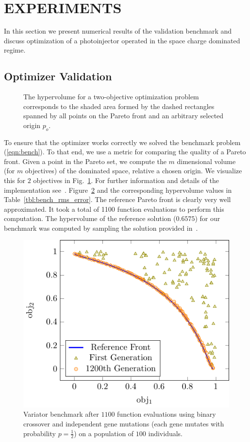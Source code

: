 \section{EXPERIMENTS} \label{sec:experiments}

In this section we present numerical results of the validation benchmark and
  discuss optimization of a photoinjector operated in the space charge dominated regime.

\subsection{Optimizer Validation}

\begin{figure}
    \centering
    \begin{tikzpicture}[text=black]
      
    \end{tikzpicture}
  \caption{The hypervolume for a two-objective optimization problem
  corresponds to the shaded area formed by the dashed rectangles spanned by
  all points on the Pareto front and an arbitrary selected origin $p_o$.}
  \label{fig:hypervolume}
\end{figure}

To ensure that the optimizer works correctly we solved the benchmark
  problem (\ref{eqn:bench}).
To that end, we use a metric for comparing the quality of a Pareto
  front.
Given a point in the Pareto set, we compute the $m$ dimensional volume (for
  $m$ objectives) of the dominated space, relative a chosen origin.
We visualize this for $2$ objectives in Fig.~\ref{fig:hypervolume}.
For further information and details of the implementation see~\cite{whbb:12}.
Figure~\ref{fig:pisa_bench} and the corresponding hypervolume values in
  Table~\ref{tbl:bench_rms_error}.
The reference Pareto front is clearly very well approximated.
It took a total of 1100 function evaluations to perform this computation.
The hypervolume of the reference solution ($0.6575$) for our benchmark was
  computed by sampling the solution provided in~\cite{hbwh:05}.

\begin{figure}
  \centering
    \includegraphics[width=0.7\linewidth]{figures/valid_front}
  \caption{Variator benchmark after $1100$ function evaluations using binary
           crossover and independent gene mutations (each gene mutates with
           probability $p=\frac{1}{2}$) on a population of $100$
           individuals.}
  \label{fig:pisa_bench}
\end{figure}

